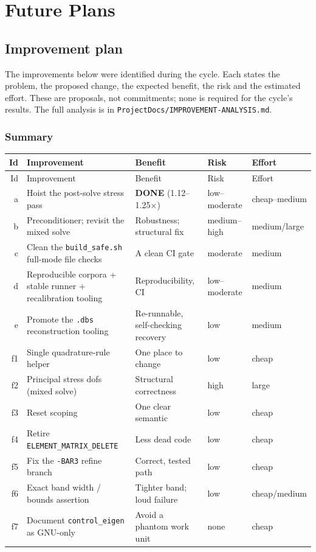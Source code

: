 \documentclass[11pt,a4paper]{report}
\newcommand{\code}[1]{\texttt{#1}}
\begin{document}
\part{Future Plans}

\chapter{Improvement plan}
\label{ch:improvements}

The improvements below were identified during the cycle. Each states the problem,
the proposed change, the expected benefit, the risk and the estimated effort.
These are proposals, not commitments; none is required for the cycle's results.
The full analysis is in \code{ProjectDocs/\allowbreak IMPROVEMENT-ANALYSIS.md}.

\section{Summary}

\begin{longtable}{@{}r L{5.2cm} L{3.4cm} L{2.2cm} L{2.2cm}@{}}
\toprule
Id & Improvement & Benefit & Risk & Effort \\
\midrule
\endfirsthead
\toprule
Id & Improvement & Benefit & Risk & Effort \\
\midrule
\endhead
\bottomrule
\endlastfoot
a  & Hoist the post-solve stress pass & \textbf{DONE} (1.12--1.25$\times$) & low--moderate & cheap--medium \\
b  & Preconditioner; revisit the mixed solve & Robustness; structural fix & medium--high & medium/large \\
c  & Clean the \code{build\_\allowbreak safe.sh} full-mode file checks & A clean CI gate & moderate & medium \\
d  & Reproducible corpora + stable runner + recalibration tooling & Reproducibility, CI & low--moderate & medium \\
e  & Promote the \code{.dbs} reconstruction tooling & Re-runnable, self-checking recovery & low & medium \\
f1 & Single quadrature-rule helper & One place to change & low & cheap \\
f2 & Principal stress dofs (mixed solve) & Structural correctness & high & large \\
f3 & Reset scoping & One clear semantic & low & cheap \\
f4 & Retire \code{ELEMENT\_\allowbreak MATRIX\_\allowbreak DELETE} & Less dead code & low & cheap \\
f5 & Fix the \code{-BAR3} refine branch & Correct, tested path & low & cheap \\
f6 & Exact band width / bounds assertion & Tighter band; loud failure & low & cheap/medium \\
f7 & Document \code{control\_\allowbreak eigen} as GNU-only & Avoid a phantom work unit & none & cheap \\
\end{longtable}
\end{document}
